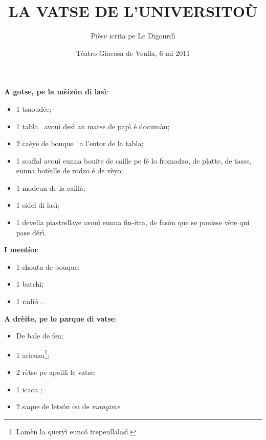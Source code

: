 \title{LA VATSE DE L’UNIVERSITO\`U}
\author{Pièse icrita pe Le Digourdì}
\date{Téatro Giacosa de Veulla, 6 mi 2011}

\maketitle






\Scenographie
\textbf{A gotse, pe la mèiz\'on di lasì}:
\begin{itemize}
\item[$\bullet$] 1 tsaoudée;
\item[$\bullet$] 1 tabla \tabla\ avouì desì an matse de papì é documàn;
\item[$\bullet$] 2 caèye de bouque \sediaLegno\ a l'entor de la tabla;
\item[$\bullet$] 1 scaffal avouì eunna bouite de caille pe fé lo fromadzo, de platte, de tasse, eunna botèille de rodzo é de vèyo;
\item[$\bullet$] 1 modeun de la caillà;
\item[$\bullet$] 1 sidel di lasì;
\item[$\bullet$] 1 devella piastrellaye avouì eunna fin-itra, de fas\'on que se pouisse vère qui pase dérì.
\end{itemize}
\vspace*{0.25cm}

\textbf{I mentèn}:

\begin{itemize}
\item[$\bullet$] 1 chouta de bouque;
\item[$\bullet$] 1 batchì;
\item[$\bullet$] 1 radi\'o \radio .
\end{itemize}
\vspace*{0.25cm}

\textbf{A drèite, pe lo parque di vatse}:

\begin{itemize}
\item[$\bullet$] De bale de fen;
\item[$\bullet$] 1 arieuza\footnote{ Lamèn la queryì eunc\'o trepeullalasì.};
\item[$\bullet$] 2 rètse pe apeillì le vatse;
\item[$\bullet$] 1 icaoa \scopa ;
\item[$\bullet$] 2 saque de lets\'on ou de \textit{mangime}.
\end{itemize}

